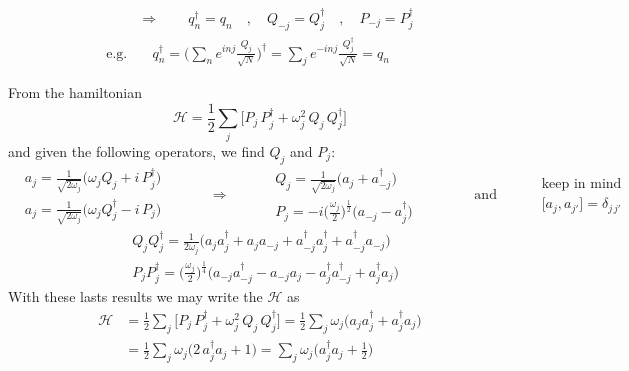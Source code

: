 \documentclass[class=article]{standalone}
\begin{document}
\begin{equation*}
\begin{split}
& \Rightarrow\quad\quad q_n^{\dagger} = q_n  \quad , \quad Q_{-j} = Q_{j}^{\dagger} \quad , \quad  P_{-j} = P_{j}^{\dagger} \\
\mbox{e.g.} & \quad q_n^{\dagger} = \Big( \sum_n e^{i n j} \frac{Q_j}{\sqrt{N}} \Big)^{\dagger} =  \sum_j e^{ - i n j} \frac{Q_j^{\dagger}}{\sqrt{N}} = q_n
\end{split}
\end{equation*}

From the hamiltonian
\begin{equation*}
\mathcal{H} = \frac{1}{2} \sum_j \Big[ P_j\,P_j^{\dagger} + \omega_j^2 \, Q_j\,Q_j^{\dagger}  \Big]
\end{equation*}
and given the following operators, we find $Q_j$ and $P_j$:
\begin{equation*}
\begin{split}
& a_j = \frac{1}{\sqrt{2\omega_j}} \Big( \omega_j Q_j + i\,P_j^{\dagger} \Big) \\
& a_j = \frac{1}{\sqrt{2\omega_j}} \Big( \omega_j Q_j^{\dagger} - i\,P_j \Big) 
\end{split}\quad\quad\quad\Rightarrow\quad\quad
\begin{split}
& Q_j = \frac{1}{\sqrt{2\omega_j}} \Big( a_j + a_{-j}^{\dagger} \Big) \\
& P_j = -i \Big( \frac{\omega_j}{2} \Big)^{\frac{1}{2}} \Big( a_{-j} - a_j^{\dagger} \Big)
\end{split}\quad\quad\quad\quad \mbox{and} \quad\quad
\begin{split}
& \mbox{keep in mind} \\
& \Big[ a_j , a_{j'} \Big] = \delta_{j \, j'}
\end{split}
\end{equation*}
\begin{equation*}
\begin{split}
& Q_j Q_j^{\dagger} = \frac{1}{2 \omega_j} \Big( a_j a_j^{\dagger} + a_j a_{-j} + a_{-j}^{\dagger} a_j^{\dagger} + a_{-j}^{\dagger} a_{-j} \Big) \\
& P_j P_j^{\dagger} =  \Big( \frac{\omega_j}{2} \Big)^{\frac{1}{4}} \Big( a_{-j} a_{-j}^{\dagger} - a_{-j} a_j - a_j^{\dagger}a_{-j}^{\dagger} + a_j^{\dagger} a_j \Big)
\end{split}
\end{equation*}
With these lasts results we may write the $\mathcal{H}$ as
\begin{equation*}
\begin{split}
\mathcal{H} & = \frac{1}{2} \sum_j \Big[ P_j\,P_j^{\dagger} + \omega_j^2 \, Q_j\,Q_j^{\dagger}  \Big]
 =  \frac{1}{2} \sum_j \omega_j \Big( a_j a_j^{\dagger} + a_j^{\dagger} a_j \Big) \\
& =  \frac{1}{2} \sum_j  \omega_j \Big( 2 \, a_j^{\dagger} a_j + 1 \Big)
= \sum_j  \omega_j \Big( a_j^{\dagger} a_j + \frac{1}{2} \Big)
\end{split}
\end{equation*}
\end{document}

